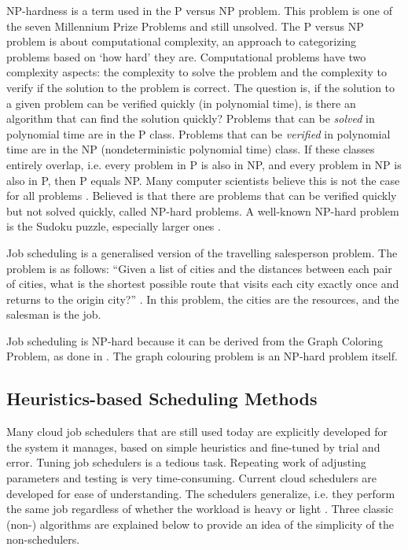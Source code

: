 NP-hardness is a term used in the P versus NP problem. This problem is one of
the seven Millennium Prize Problems \cite{carlson2006} and still unsolved. The
P versus NP problem is about computational complexity, an approach to
categorizing problems based on `how hard' they are. Computational problems
have two complexity aspects: the complexity to solve the problem and the
complexity to verify if the solution to the problem is correct. The question
is, if the solution to a given problem can be verified quickly (in polynomial
time), is there an algorithm that can find the solution quickly? Problems that
can be \emph{solved} in polynomial time are in the P class. Problems that can
be \emph{verified} in polynomial time are in the NP (nondeterministic
polynomial time) class. If these classes entirely overlap, i.e. every problem in
P is also in NP, and every problem in NP is also in P, then P equals NP. Many
computer scientists believe this is not the case for all problems
\cite{rosenberger2012}. Believed is that there are problems that can be
verified quickly but not solved quickly, called NP-hard problems. A
well-known NP-hard problem is the Sudoku puzzle, especially larger ones
\cite{yato2003}.

Job scheduling is a generalised version of the travelling salesperson problem.
The problem is as follows: ``Given a list of cities and the distances between
each pair of cities, what is the shortest possible route that visits each city
exactly once and returns to the origin city?'' \cite{flood1956}. In this
problem, the cities are the resources, and the salesman is the job.

Job scheduling is NP-hard because it can be derived from the Graph Coloring
Problem, as done in . The graph colouring problem is an NP-hard
problem itself.


\subsection{Heuristics-based Scheduling Methods}\label{sec:situ}

Many cloud job schedulers that are still used today are explicitly developed
for the system it manages, based on simple heuristics and fine-tuned by trial
and error. Tuning job schedulers is a tedious task. Repeating work of adjusting
parameters and testing is very time-consuming. Current cloud schedulers are
developed for ease of understanding. The schedulers generalize,
i.e. they perform the same job regardless of whether the workload is heavy or
light \cite{mao2019}. Three classic (non-\ai) algorithms are explained below
to provide an idea of the simplicity of the non-\ai schedulers.


